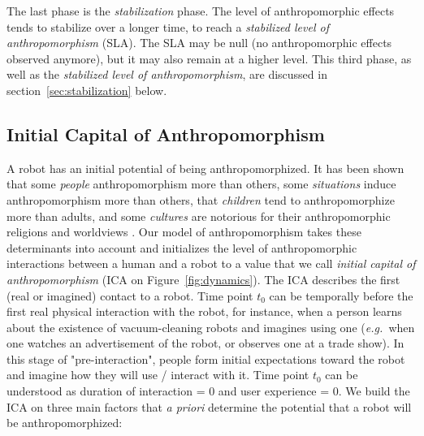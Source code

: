 \documentclass[lettersize, apacite, twoside, HRI]{apa_HRI}
\newcommand{\eg}{{\textit{e.g.~}}}
\begin{document}
The last phase is the \emph{stabilization} phase. The level of anthropomorphic
effects tends to stabilize over a longer time, to reach a \emph{stabilized
level of anthropomorphism} (SLA). The SLA may be null (no anthropomorphic
effects observed anymore), but it may also remain at a higher level.  This
third phase, as well as the \emph{stabilized level of anthropomorphism}, are
discussed in section~\ref{sec:stabilization} below.


\subsection{Initial Capital of Anthropomorphism}
\label{sec:ica}

A robot has an initial potential of being anthropomorphized. It has been shown that some \textit{people} anthropomorphism more than others, some \textit{situations} induce anthropomorphism more than others, that \textit{children} tend to anthropomorphize more than adults, and some \textit{cultures} are notorious for their anthropomorphic religions and worldviews \cite{epley_when_2008}. Our model of anthropomorphism takes these determinants into account and initializes the level of anthropomorphic interactions between a human and a robot to a value that we call \textit{initial capital of anthropomorphism} (ICA on Figure~\ref{fig:dynamics}). The ICA describes the first (real or imagined) contact to a robot. Time point $t_{0}$ can be temporally before the first real physical interaction with the robot, for instance, when a person learns about the existence of vacuum-cleaning robots and imagines using one (\eg when one watches an advertisement of the robot, or observes one at a trade show). In this stage of "pre-interaction", people form initial expectations toward the robot and imagine how they will use / interact with it. Time point $t_{0}$ can be understood as duration of interaction = 0 and user experience = 0. We build the ICA on three main factors that \textit{a priori} determine the potential that a robot will be anthropomorphized:
	
\end{document}
